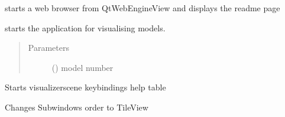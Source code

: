 \documentclass[letterpaper,10pt,english]{sphinxmanual}
\begin{document}
\begin{fulllineitems}
\begin{fulllineitems}
\label{\detokenize{api:beamon.ui.main.Main.startQswHelp}}
starts a web browser from QtWebEngineView and displays the readme page

\end{fulllineitems}


\begin{fulllineitems}
\label{\detokenize{api:beamon.ui.main.Main.startVisualizer}}
starts the application for visualising models.
\begin{quote}\begin{description}
\item[{Parameters}] \leavevmode
{} () \textendash{} model number

\end{description}\end{quote}

\end{fulllineitems}


\begin{fulllineitems}
\label{\detokenize{api:beamon.ui.main.Main.start_visualizer_manual}}
Starts visualizer\sphinxhyphen{}scene keybindings help table

\end{fulllineitems}


\begin{fulllineitems}
\label{\detokenize{api:beamon.ui.main.Main.tileView}}
Changes Subwindows order to TileView

\end{fulllineitems}


\end{fulllineitems}
\end{document}
